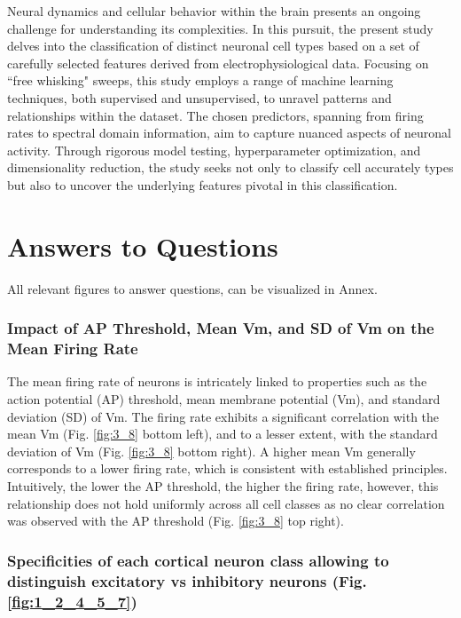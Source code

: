 \documentclass{IEEEtran}
\begin{document}
Neural dynamics and cellular behavior within the brain presents an ongoing challenge for understanding its complexities. In this pursuit, the present study delves into the classification of distinct neuronal cell types based on a set of carefully selected features derived from electrophysiological data. Focusing on ``free whisking" sweeps, this study employs a range of machine learning techniques, both supervised and unsupervised, to unravel patterns and relationships within the dataset. The chosen predictors, spanning from firing rates to spectral domain information, aim to capture nuanced aspects of neuronal activity. Through rigorous model testing, hyperparameter optimization, and dimensionality reduction, the study seeks not only to classify cell accurately types but also to uncover the underlying features pivotal in this classification.


\section{Answers to Questions}

All relevant figures to answer questions, can be visualized in Annex.

\subsubsection{Impact of AP Threshold, Mean Vm, and SD of Vm on the Mean Firing Rate}

The mean firing rate of neurons is intricately linked to properties such as the action potential (AP) threshold, mean membrane potential (Vm), and standard deviation (SD) of Vm.
The firing rate exhibits a significant correlation with the mean Vm (Fig. \ref{fig:3_8} bottom left), and to a lesser extent, with the standard deviation of Vm (Fig. \ref{fig:3_8} bottom right). 
A higher mean Vm generally corresponds to a lower firing rate, which is consistent with established principles. Intuitively, the lower the AP threshold, the higher the firing rate, however, this relationship does not hold uniformly across all cell classes as no clear correlation was observed with the AP threshold (Fig. \ref{fig:3_8} top right).

\subsubsection{Specificities of each cortical neuron class allowing to distinguish excitatory vs inhibitory neurons (Fig. \ref{fig:1_2_4_5_7})}
\end{document}

